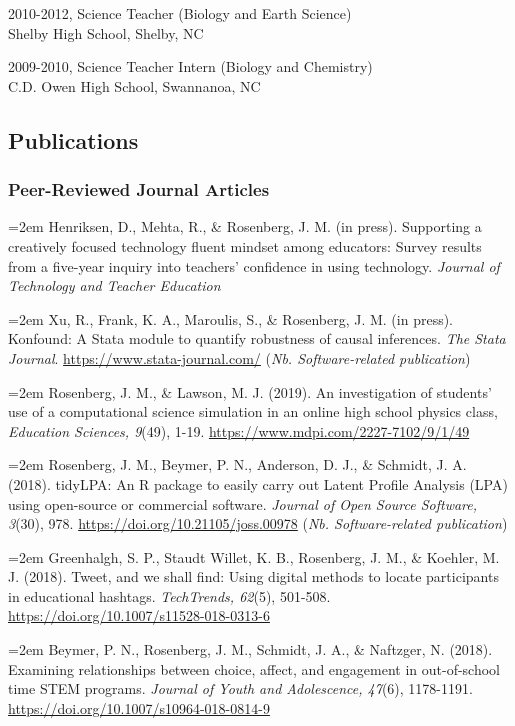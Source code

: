 \documentclass[14,]{article}
\begin{document}
2010-2012, Science Teacher (Biology and Earth Science)\\
Shelby High School, Shelby, NC

2009-2010, Science Teacher Intern (Biology and Chemistry)\\
C.D. Owen High School, Swannanoa, NC

\subsection{Publications}\label{publications}

\subsubsection{Peer-Reviewed Journal
Articles}\label{peer-reviewed-journal-articles}

\hangindent=2em Henriksen, D., Mehta, R., \& Rosenberg, J. M. (in
press). Supporting a creatively focused technology fluent mindset among
educators: Survey results from a five-year inquiry into teachers'
confidence in using technology. \emph{Journal of Technology and Teacher
Education}

\hangindent=2em Xu, R., Frank, K. A., Maroulis, S., \& Rosenberg, J. M.
(in press). Konfound: A Stata module to quantify robustness of causal
inferences. \emph{The Stata Journal}.
\url{https://www.stata-journal.com/} (\emph{Nb. Software-related
publication})

\hangindent=2em Rosenberg, J. M., \& Lawson, M. J. (2019). An
investigation of students' use of a computational science simulation in
an online high school physics class, \emph{Education Sciences, 9}(49),
1-19. \url{https://www.mdpi.com/2227-7102/9/1/49}

\hangindent=2em Rosenberg, J. M., Beymer, P. N., Anderson, D. J., \&
Schmidt, J. A. (2018). tidyLPA: An R package to easily carry out Latent
Profile Analysis (LPA) using open-source or commercial software.
\emph{Journal of Open Source Software, 3}(30), 978.
\url{https://doi.org/10.21105/joss.00978} (\emph{Nb. Software-related
publication})

\hangindent=2em Greenhalgh, S. P., Staudt Willet, K. B., Rosenberg, J.
M., \& Koehler, M. J. (2018). Tweet, and we shall find: Using digital
methods to locate participants in educational hashtags.
\emph{TechTrends, 62}(5), 501-508.
\url{https://doi.org/10.1007/s11528-018-0313-6}

\hangindent=2em Beymer, P. N., Rosenberg, J. M., Schmidt, J. A., \&
Naftzger, N. (2018). Examining relationships between choice, affect, and
engagement in out-of-school time STEM programs. \emph{Journal of Youth
and Adolescence, 47}(6), 1178-1191.
\url{https://doi.org/10.1007/s10964-018-0814-9}
\end{document}
